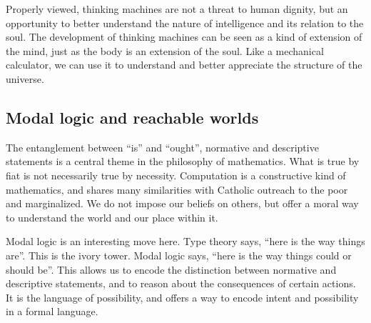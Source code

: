 \documentclass[sigplan,nonacm]{acmart}\settopmatter{printfolios=false,printccs=false,printacmref=false}
\begin{document}
  Properly viewed, thinking machines are not a threat to human dignity, but an opportunity to better understand the nature of intelligence and its relation to the soul. The development of thinking machines can be seen as a kind of extension of the mind, just as the body is an extension of the soul. Like a mechanical calculator, we can use it to understand and better appreciate the structure of the universe.

  \subsection{Modal logic and reachable worlds}

  The entanglement between ``is'' and ``ought'', normative and descriptive statements is a central theme in the philosophy of mathematics. What is true by fiat is not necessarily true by necessity. Computation is a constructive kind of mathematics, and shares many similarities with Catholic outreach to the poor and marginalized. We do not impose our beliefs on others, but offer a moral way to understand the world and our place within it.

  Modal logic is an interesting move here. Type theory says, ``here is the way things are''. This is the ivory tower. Modal logic says, ``here is the way things could or should be''. This allows us to encode the distinction between normative and descriptive statements, and to reason about the consequences of certain actions. It is the language of possibility, and offers a way to encode intent and possibility in a formal language.

  
\end{document}
